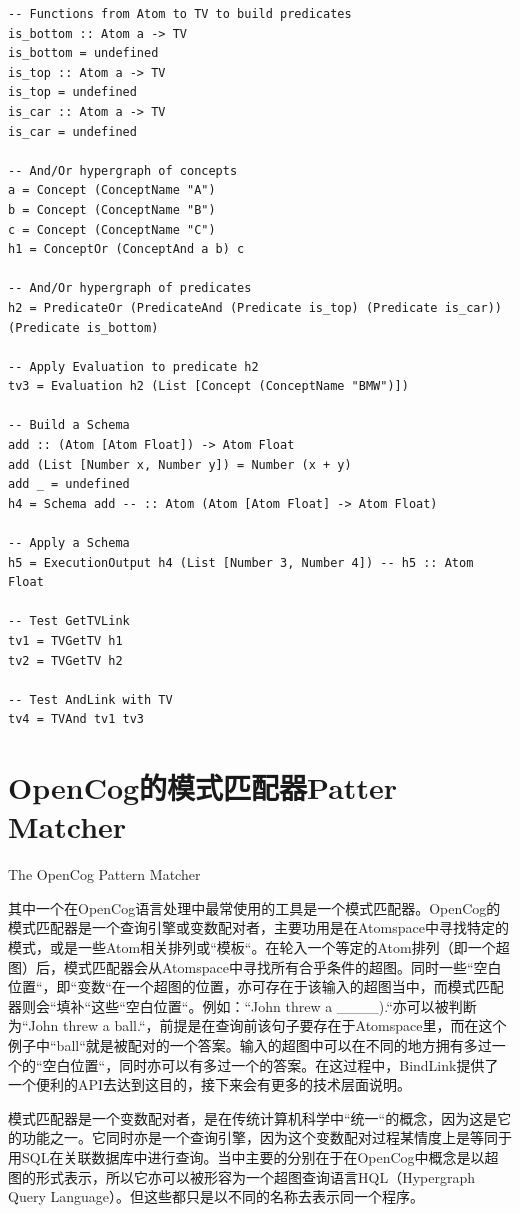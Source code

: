 \begin{verbatim}
-- Functions from Atom to TV to build predicates
is_bottom :: Atom a -> TV
is_bottom = undefined
is_top :: Atom a -> TV
is_top = undefined
is_car :: Atom a -> TV
is_car = undefined

-- And/Or hypergraph of concepts
a = Concept (ConceptName "A")
b = Concept (ConceptName "B")
c = Concept (ConceptName "C")
h1 = ConceptOr (ConceptAnd a b) c

-- And/Or hypergraph of predicates
h2 = PredicateOr (PredicateAnd (Predicate is_top) (Predicate is_car)) (Predicate is_bottom)

-- Apply Evaluation to predicate h2
tv3 = Evaluation h2 (List [Concept (ConceptName "BMW")])

-- Build a Schema
add :: (Atom [Atom Float]) -> Atom Float
add (List [Number x, Number y]) = Number (x + y)
add _ = undefined
h4 = Schema add -- :: Atom (Atom [Atom Float] -> Atom Float)

-- Apply a Schema
h5 = ExecutionOutput h4 (List [Number 3, Number 4]) -- h5 :: Atom Float

-- Test GetTVLink
tv1 = TVGetTV h1
tv2 = TVGetTV h2

-- Test AndLink with TV
tv4 = TVAnd tv1 tv3
\end{verbatim}	

\section{OpenCog的模式匹配器Patter Matcher}{The OpenCog Pattern Matcher}

其中一个在OpenCog语言处理中最常使用的工具是一个模式匹配器。OpenCog的模式匹配器是一个查询引擎或变数配对者，主要功用是在Atomspace中寻找特定的模式，或是一些Atom相关排列或“模板“。在轮入一个等定的Atom排列（即一个超图）后，模式匹配器会从Atomspace中寻找所有合乎条件的超图。同时一些“空白位置“，即“变数“在一个超图的位置，亦可存在于该输入的超图当中，而模式匹配器则会“填补“这些“空白位置“。例如：“John threw a \_\_\_\_).“亦可以被判断为“John threw a ball.“，前提是在查询前该句子要存在于Atomspace里，而在这个例子中“ball“就是被配对的一个答案。输入的超图中可以在不同的地方拥有多过一个的“空白位置“，同时亦可以有多过一个的答案。在这过程中，BindLink提供了一个便利的API去达到这目的，接下来会有更多的技术层面说明。

模式匹配器是一个变数配对者，是在传统计算机科学中“统一“的概念，因为这是它的功能之一。它同时亦是一个查询引擎，因为这个变数配对过程某情度上是等同于用SQL在关联数据库中进行查询。当中主要的分别在于在OpenCog中概念是以超图的形式表示，所以它亦可以被形容为一个超图查询语言HQL（Hypergraph Query Language）。但这些都只是以不同的名称去表示同一个程序。

